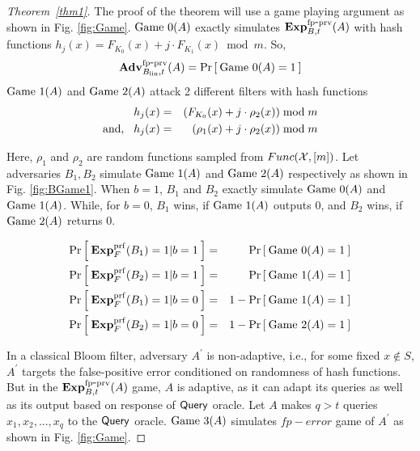 \begin{proof}[Theorem~\ref{thm1}]
The proof of the theorem will use a game playing argument as shown in Fig. \ref{fig:Game}. $\text{Game 0}(A)$ exactly simulates $\mathrm{\mathbf{Exp}}^{\mathrm{fp\mbox{-}prv}}_{B,t}(A)$ with hash functions $h_j(x) =  F_{K_0}(x) + j\cdot F_{K_1}(x) \bmod m$. So,
\begin{equation}
\mathrm{\mathbf{Adv}}^{\mathrm{fp\mbox{-}prv}}_{B_{\mathrm{lin}},t}(A) = \Pr\left[\: \text{Game 0}(A)=1 \:\right]\label{eq:0}
\end{equation}
 $\text{Game 1}(A)$ and $\text{Game 2}(A)$ attack 2 different filters with hash functions 
\begin{eqnarray*}
h_j(x) &=& ( F_{K_0}(x) + j\cdot \rho_2(x)) \bmod m\\
\mathrm{and,}\hspace*{2ex} h_j(x) &=& ( \rho_1(x) + j \cdot \rho_2(x)) \bmod m 
\end{eqnarray*}

Here, $\rho_1$ and $\rho_2$ are random functions sampled from $Func({\cal X},[m])$. Let adversaries $B_1, B_2$ simulate $\text{Game 1}(A)$ and $\text{Game 2}(A)$ respectively as shown in Fig. \ref{fig:BGame1}. When $b=1$, $B_1$ and $B_2$ exactly simulate $\text{Game 0}(A)$
and $\text{Game 1}(A)$. While, for $b=0$, $B_1$ wins, if $\text{Game 1}(A)$ outputs 0, and  $B_2$ wins, if $\text{Game 2}(A)$ returns 0.

\begin{eqnarray}
\Pr\left[\: \mathbf{Exp}^{\mathrm{prf}}_{F}(B_1) = 1|b=1 \:\right] &=& \Pr\left[\: \text{Game 0}(A)=1 \:\right]\label{eq:m1}\\
\Pr\left[\: \mathbf{Exp}^{\mathrm{prf}}_{F}(B_2) = 1|b=1 \:\right] &=& \Pr\left[\: \text{Game 1}(A)=1 \:\right]\label{eq:m2}\\
\Pr\left[\: \mathbf{Exp}^{\mathrm{prf}}_{F}(B_1) = 1|b=0 \:\right] &=& 1-\Pr\left[\: \text{Game 1}(A)=1 \:\right]\label{eq:m3}\\
\Pr\left[\: \mathbf{Exp}^{\mathrm{prf}}_{F}(B_2) = 1|b=0 \:\right] &=& 1-\Pr\left[\: \text{Game 2}(A)=1 \:\right]\label{eq:m4}
\end{eqnarray}

\par{In a classical Bloom filter, adversary $A^{'}$ is non-adaptive, i.e., for some fixed $x \notin S$, $A^{'}$ targets the false-positive error conditioned on randomness of hash functions. But in the $\mathrm{\mathbf{Exp}}^{\mathrm{fp\mbox{-}prv}}_{B,t}(A)$ game, $A$ is adaptive, as it can adapt its queries as well as its output based on response of $\mathsf{Query}$ oracle. Let $A$ makes $q>t$ queries $x_1, x_2, ..., x_q$ to the $\mathsf{Query}$ oracle. $\text{Game 3}(A)$ simulates $fp-error$ game of $A^{'}$ as shown in Fig. \ref{fig:Game}.}


\end{proof}
